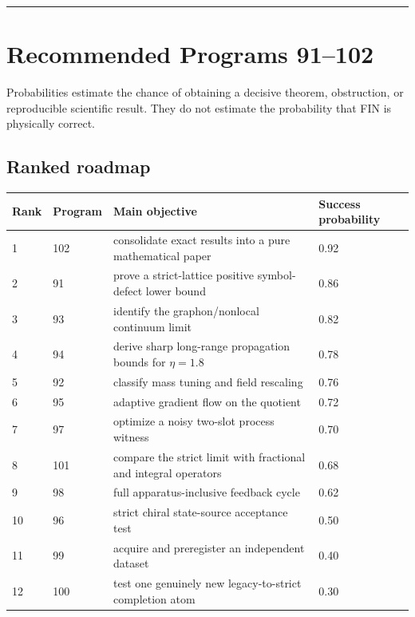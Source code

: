 \documentclass[11pt,a4paper,openany]{report}
\begin{document}
\par\medskip\hrule\medskip

\chapter{Recommended Programs 91--102}

Probabilities estimate the chance of obtaining a decisive theorem, obstruction, or reproducible scientific result. They do not estimate the probability that FIN is physically correct.

\section{Ranked roadmap}

\begin{center}
\begingroup\small
\setlength{\tabcolsep}{3.5pt}
\renewcommand{\arraystretch}{1.16}
\begin{longtable}{@{}p{}p{}p{}p{}@{}}
\toprule
\textbf{Rank} & \textbf{Program} & \textbf{Main objective} & \textbf{Success probability} \\
\midrule
\endhead
1 & 102 & consolidate exact results into a pure mathematical paper & 0.92 \\
2 & 91 & prove a strict-lattice positive symbol-defect lower bound & 0.86 \\
3 & 93 & identify the graphon/\allowbreak{}nonlocal continuum limit & 0.82 \\
4 & 94 & derive sharp long-range propagation bounds for \(\eta=1.8\) & 0.78 \\
5 & 92 & classify mass tuning and field rescaling & 0.76 \\
6 & 95 & adaptive gradient flow on the quotient & 0.72 \\
7 & 97 & optimize a noisy two-slot process witness & 0.70 \\
8 & 101 & compare the strict limit with fractional and integral operators & 0.68 \\
9 & 98 & full apparatus-inclusive feedback cycle & 0.62 \\
10 & 96 & strict chiral state-source acceptance test & 0.50 \\
11 & 99 & acquire and preregister an independent dataset & 0.40 \\
12 & 100 & test one genuinely new legacy-to-strict completion atom & 0.30 \\
\bottomrule
\end{longtable}
\endgroup
\end{center}
\end{document}
